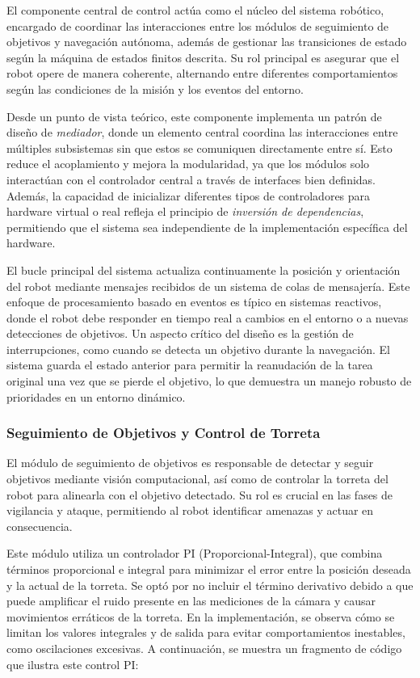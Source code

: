 El componente central de control actúa como el núcleo del sistema robótico, encargado de coordinar las interacciones entre los módulos de seguimiento de objetivos y navegación autónoma, además de gestionar las transiciones de estado según la máquina de estados finitos descrita. Su rol principal es asegurar que el robot opere de manera coherente, alternando entre diferentes comportamientos según las condiciones de la misión y los eventos del entorno.

Desde un punto de vista teórico, este componente implementa un patrón de diseño de \textit{mediador}, donde un elemento central coordina las interacciones entre múltiples subsistemas sin que estos se comuniquen directamente entre sí. Esto reduce el acoplamiento y mejora la modularidad, ya que los módulos solo interactúan con el controlador central a través de interfaces bien definidas. Además, la capacidad de inicializar diferentes tipos de controladores para hardware virtual o real refleja el principio de \textit{inversión de dependencias}, permitiendo que el sistema sea independiente de la implementación específica del hardware.

El bucle principal del sistema actualiza continuamente la posición y orientación del robot mediante mensajes recibidos de un sistema de colas de mensajería. Este enfoque de procesamiento basado en eventos es típico en sistemas reactivos, donde el robot debe responder en tiempo real a cambios en el entorno o a nuevas detecciones de objetivos. Un aspecto crítico del diseño es la gestión de interrupciones, como cuando se detecta un objetivo durante la navegación. El sistema guarda el estado anterior para permitir la reanudación de la tarea original una vez que se pierde el objetivo, lo que demuestra un manejo robusto de prioridades en un entorno dinámico.

\subsubsection{Seguimiento de Objetivos y Control de Torreta}

El módulo de seguimiento de objetivos es responsable de detectar y seguir objetivos mediante visión computacional, así como de controlar la torreta del robot para alinearla con el objetivo detectado. Su rol es crucial en las fases de vigilancia y ataque, permitiendo al robot identificar amenazas y actuar en consecuencia.


Este módulo utiliza un controlador PI (Proporcional-Integral), que combina términos proporcional e integral para minimizar el error entre la posición deseada y la actual de la torreta. Se optó por no incluir el término derivativo debido a que puede amplificar el ruido presente en las mediciones de la cámara y causar movimientos erráticos de la torreta. En la implementación, se observa cómo se limitan los valores integrales y de salida para evitar comportamientos inestables, como oscilaciones excesivas. A continuación, se muestra un fragmento de código que ilustra este control PI:

